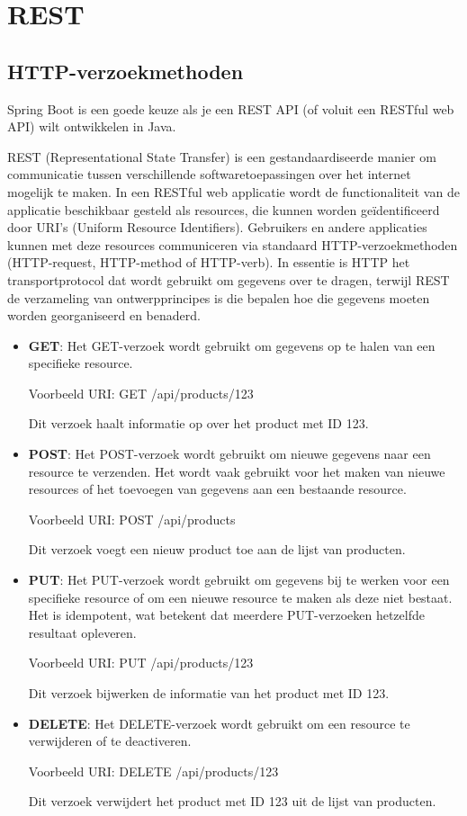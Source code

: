 \chapter{REST}

\section{HTTP-verzoekmethoden}

Spring Boot is een goede keuze als je een REST API (of voluit een RESTful web API) wilt ontwikkelen in Java.

REST (Representational State Transfer) is een gestandaardiseerde manier om communicatie tussen verschillende softwaretoepassingen over het internet mogelijk te maken. 
In een RESTful web applicatie wordt de functionaliteit van de applicatie beschikbaar gesteld als resources, die kunnen worden geïdentificeerd door URI's (Uniform Resource Identifiers).  Gebruikers en andere applicaties kunnen met deze resources communiceren via standaard HTTP-verzoekmethoden (HTTP-request, HTTP-method of HTTP-verb). In essentie is HTTP het transportprotocol dat wordt gebruikt om gegevens over te dragen,  terwijl REST de verzameling van ontwerpprincipes is die bepalen hoe die gegevens moeten worden georganiseerd en benaderd.

\begin{itemize}
\item \textbf{GET}: Het GET-verzoek wordt gebruikt om gegevens op te halen van een specifieke resource. 

Voorbeeld URI: GET /api/products/123

Dit verzoek haalt informatie op over het product met ID 123.

\item \textbf{POST}: Het POST-verzoek wordt gebruikt om nieuwe gegevens naar een resource te verzenden. Het wordt vaak gebruikt voor het maken van nieuwe resources of het toevoegen van gegevens aan een bestaande resource.

Voorbeeld URI: POST /api/products

Dit verzoek voegt een nieuw product toe aan de lijst van producten.

\item \textbf{PUT}: Het PUT-verzoek wordt gebruikt om gegevens bij te werken voor een specifieke resource of om een nieuwe resource te maken als deze niet bestaat. Het is idempotent, wat betekent dat meerdere PUT-verzoeken hetzelfde resultaat opleveren.

Voorbeeld URI: PUT /api/products/123

Dit verzoek bijwerken de informatie van het product met ID 123.

\item \textbf{DELETE}: Het DELETE-verzoek wordt gebruikt om een resource te verwijderen of te deactiveren.

Voorbeeld URI: DELETE /api/products/123

Dit verzoek verwijdert het product met ID 123 uit de lijst van producten.
\end{itemize}


